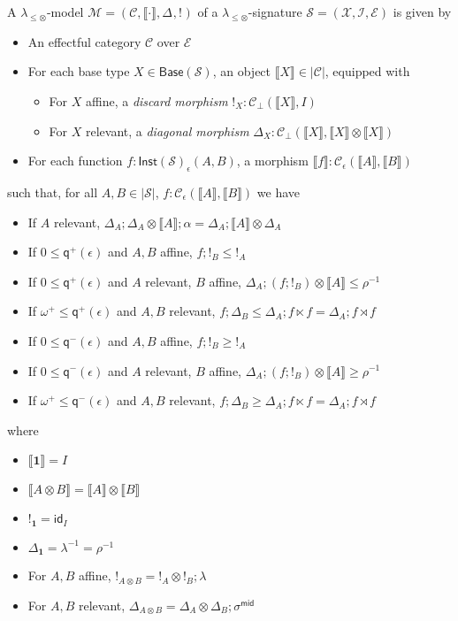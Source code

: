\documentclass[acmsmall,screen,review]{acmart}
\newcommand{\mc}[1]{\ensuremath{\mathcal{#1}}}
\newcommand{\mb}[1]{\ensuremath{\mathbf{#1}}}
\newcommand{\ms}[1]{\ensuremath{\mathsf{#1}}}
\newcommand{\dnt}[1]{\llbracket{#1}\rrbracket}
\newcommand{\tmor}[1]{{!}_{#1}}
\newcommand{\dmor}[1]{{\Delta}_{#1}}
\newcommand{\submonssa}{\(\lambda_{\leq\otimes}\)}
\newcommand{\zeroq}{0}
\newcommand{\cpyq}{\omega^+}
\newcommand{\alquant}{\ms{q}}
\begin{document}
\begin{definition}[\submonssa-model]
  A \submonssa-model $\mc{M} = (\mc{C}, \dnt{\cdot}, \dmor{}, \tmor{})$ of a \submonssa-signature
  $\mc{S} = (\mc{X}, \mc{I}, \mc{E})$ is given by
  \begin{itemize}
    \item An effectful category $\mc{C}$ over $\mc{E}$
    \item For each base type $X \in \ms{Base}(\mc{S})$, an object $\dnt{X} \in |\mc{C}|$, equipped
    with
    \begin{itemize}
      \item For $X$ affine, a \emph{discard morphism} $\tmor{X} : \mc{C}_\bot(\dnt{X}, I)$
      \item For $X$ relevant, a \emph{diagonal morphism} $\dmor{X} : \mc{C}_\bot(\dnt{X}, \dnt{X}
      \otimes \dnt{X})$
    \end{itemize}
    \item For each function $f : \ms{Inst}(\mc{S})_\epsilon(A, B)$, a morphism $\dnt{f} :
    \mc{C}_\epsilon(\dnt{A}, \dnt{B})$
  \end{itemize}
  such that, for all $A, B \in |\mc{S}|$, $f : \mc{C}_\epsilon(\dnt{A}, \dnt{B})$ we have
  \begin{itemize}
    \item If $A$ relevant, 
      $\dmor{A} ; \dmor{A} \otimes \dnt{A} ; \alpha = \dmor{A} ; \dnt{A} \otimes \dmor{A}$
    \item If $\zeroq \leq \alquant^+(\epsilon)$ and $A, B$ affine, $f ; !_B \leq !_A$
    \item If $\zeroq \leq \alquant^+(\epsilon)$ and $A$ relevant, $B$ affine, 
      $\dmor{A} ; (f ; !_B) \otimes \dnt{A} \leq \rho^{-1}$
    \item If $\cpyq \leq \alquant^+(\epsilon)$ and $A, B$ relevant, 
    $f ; \dmor{B} \leq \dmor{A} ; f \ltimes f = \dmor{A} ; f \rtimes f$
    \item If $\zeroq \leq \alquant^-(\epsilon)$ and $A, B$ affine, $f ; !_B \geq !_A$
    \item If $\zeroq \leq \alquant^-(\epsilon)$ and $A$ relevant, $B$ affine, 
      $\dmor{A} ; (f ; !_B) \otimes \dnt{A} \geq \rho^{-1}$
    \item If $\cpyq \leq \alquant^-(\epsilon)$ and $A, B$ relevant, 
    $f ; \dmor{B} \geq \dmor{A} ; f \ltimes f = \dmor{A} ; f \rtimes f$
  \end{itemize}
  where
  \begin{itemize}
    \item $\dnt{\mb{1}} = I$
    \item $\dnt{A \otimes B} = \dnt{A} \otimes \dnt{B}$
    \item $!_{\mb{1}} = \ms{id}_I$
    \item $\Delta_{\mb{1}} = \lambda^{-1} = \rho^{-1}$
    \item For $A, B$ affine, $!_{A \otimes B} = !_A \otimes !_B ; \lambda$
    \item For $A, B$ relevant, 
    $\Delta_{A \otimes B} 
      = \dmor{A} \otimes \dmor{B}
      ; \sigma^{\ms{mid}}
    $
  \end{itemize}
\end{definition}
\end{document}
